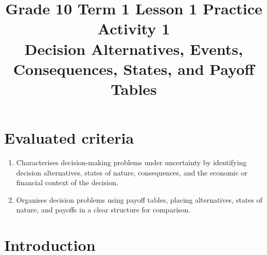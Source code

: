 \makeatletter
{}
\makeatother






\title{Grade 10 Term 1 Lesson 1 Practice Activity 1\\Decision Alternatives, Events, Consequences, States, and Payoff Tables}
\author{}
\date{}


	\maketitle

	\setcounter{tocdepth}{1}
	\setcounter{secnumdepth}{2}
	\label{toc}
	\tableofcontents

	\section*{Evaluated criteria}
	\begin{enumerate}[label=\textbf{C\arabic*}]
		\item Characterises decision-making problems under uncertainty by identifying decision alternatives, states of nature, consequences, and the economic or financial context of the decision.
		\item Organises decision problems using payoff tables, placing alternatives, states of nature, and payoffs in a clear structure for comparison.
	\end{enumerate}

	\section{Introduction} 
	\label{sec:introduction}
\label{tone:legend}
 
	
	\vspace{5mm} 
	
